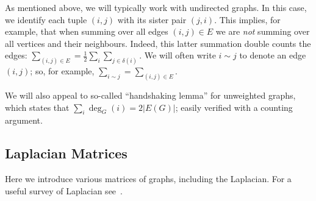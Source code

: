 As mentioned above, we will typically  work  with undirected graphs. In this case, we identify each tuple $(i,j)$ with its sister pair $(j,i)$. This implies, for example, that when summing over all edges $(i,j)\in E$ we are \emph{not} summing over all vertices and their neighbours. Indeed, this latter summation double counts the edges: $\sum_{(i,j)\in E}=\frac{1}{2}\sum_{i}\sum_{j\in\delta(i)}$. We will often write $i\sim j$ to denote an edge $(i,j)$; so, for example, $\sum_{i\sim j}=\sum_{(i,j)\in E}$. 

We will also appeal to so-called ``handshaking lemma'' for unweighted graphs, which states that $\sum_i \deg_G(i) = 2|E(G)|$; easily verified with a counting argument. 


\subsection{Laplacian Matrices}
\label{sec:background_laplacian}
Here we introduce various matrices of graphs, including the Laplacian. For a useful survey of Laplacian see~\cite{merris1994laplacian}.  


